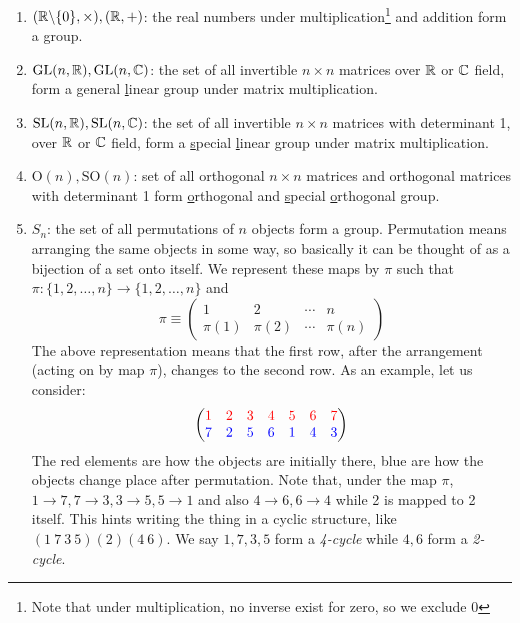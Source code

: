 \begin{enumerate}
    \item $(\mathbb{R}\backslash \{0\}, \times),(\mathbb{R}, +)$: the real numbers under multiplication\footnote{Note that under multiplication, no inverse exist for zero, so we exclude 0} and addition form a group. 
    \item $\mathrm{GL}(n,\mathbb{R}), \mathrm{GL}(n,\mathbb{C})$: the set of all invertible $n\times n$ matrices over $\mathbb{R}$ or $\mathbb{C}$ field, form a \underline{g}eneral \underline{l}inear group under matrix multiplication. 
    \item $\mathrm{SL}(n,\mathbb{R}),\mathrm{SL}(n,\mathbb{C})$: the set of all invertible $n\times n$ matrices with determinant 1, over $\mathbb{R}$ or $\mathbb{C}$ field, form a \underline{s}pecial \underline{l}inear group under matrix multiplication. 
    \item $\mathrm{O}(n),\mathrm{SO}(n)$: set of all orthogonal $n\times n$ matrices and orthogonal matrices with determinant 1 form \underline{o}rthogonal and \underline{s}pecial \underline{o}rthogonal group.
    \item $S_n$: the set of all permutations of $n$ objects form a group.  
    Permutation means arranging the same objects in some way, so basically it can be thought of as a bijection of a set onto itself. We represent these maps by $\pi$ such that $\pi : \{1,2,\ldots,n\}\rightarrow \{1,2,\ldots,n\}$ and 
$$   \pi \equiv 
\begin{pmatrix}
  1         & 2         & \cdots & n \\
  \pi(1) & \pi(2) & \cdots & \pi(n)
\end{pmatrix}$$
The above representation means that the first row, after the arrangement (acting on by map $\pi$), changes to the second row. As an example, let us consider: 
$$\begin{pmatrix}
    \mathcolor{red}{1&2&3&4&5&6&7}\\
    \mathcolor{blue}{7&2&5&6&1&4&3}
\end{pmatrix}$$
The red elements are how the objects are initially there, blue are how the objects change place after permutation. Note that, under the map $\pi$, $1\rightarrow 7, 7\rightarrow 3, 3 \rightarrow 5, 5 \rightarrow 1$ and also $4\rightarrow 6, 6\rightarrow 4$ while 2 is mapped to 2 itself. This hints writing the thing in a cyclic structure, like $(1\ 7\ 3\ 5)(2)(4\ 6)$. We say $1,7,3,5$ form a \textit{4-cycle} while $4,6$ form a \textit{2-cycle}. 

\end{enumerate}
